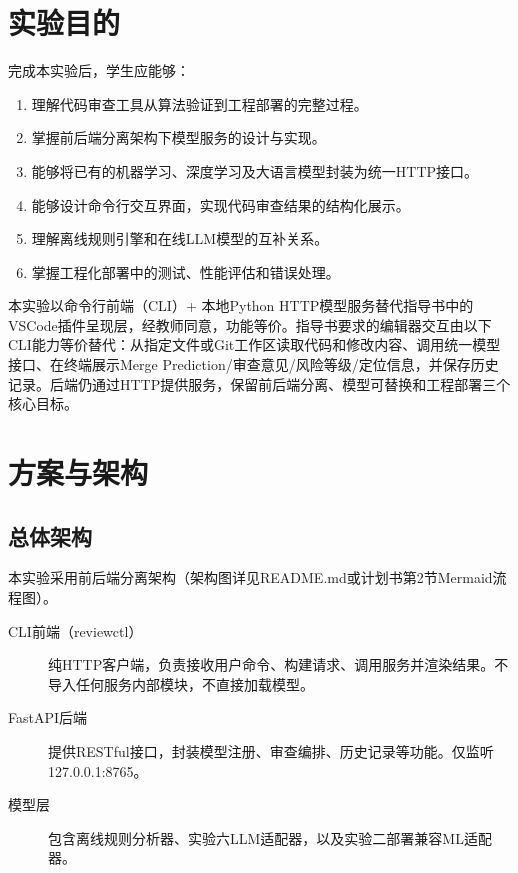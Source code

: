 \documentclass{experimentreport}
\begin{document}
\makereporthead

\section{实验目的}

完成本实验后，学生应能够：
\begin{enumerate}
  \item 理解代码审查工具从算法验证到工程部署的完整过程。
  \item 掌握前后端分离架构下模型服务的设计与实现。
  \item 能够将已有的机器学习、深度学习及大语言模型封装为统一HTTP接口。
  \item 能够设计命令行交互界面，实现代码审查结果的结构化展示。
  \item 理解离线规则引擎和在线LLM模型的互补关系。
  \item 掌握工程化部署中的测试、性能评估和错误处理。
\end{enumerate}

本实验以命令行前端（CLI）+ 本地Python HTTP模型服务替代指导书中的VSCode插件呈现层，经教师同意，功能等价。指导书要求的编辑器交互由以下CLI能力等价替代：从指定文件或Git工作区读取代码和修改内容、调用统一模型接口、在终端展示Merge Prediction/审查意见/风险等级/定位信息，并保存历史记录。后端仍通过HTTP提供服务，保留前后端分离、模型可替换和工程部署三个核心目标。

\section{方案与架构}

\subsection{总体架构}

本实验采用前后端分离架构（架构图详见README.md或计划书第2节Mermaid流程图）。

\begin{description}
  \item[CLI前端（reviewctl）] 纯HTTP客户端，负责接收用户命令、构建请求、调用服务并渲染结果。不导入任何服务内部模块，不直接加载模型。
  \item[FastAPI后端] 提供RESTful接口，封装模型注册、审查编排、历史记录等功能。仅监听127.0.0.1:8765。
  \item[模型层] 包含离线规则分析器、实验六LLM适配器，以及实验二部署兼容ML适配器。
\end{description}
\end{document}
